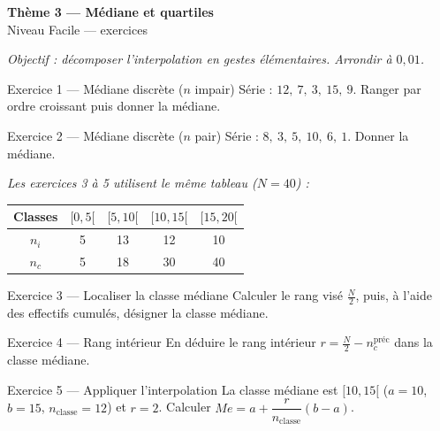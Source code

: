 \documentclass[11pt,a4paper]{article}
\newcommand{\bandeau}[2]{%
\begin{tcolorbox}[boxbase,colback=primary,colframe=primarydark,halign=center,
   before skip=2pt,after skip=12pt]
{\LARGE\bfseries\color{white} #1}\\[3pt]{\normalsize\color{white} #2}
\end{tcolorbox}}
\newcommand{\med}{M\!e}
\begin{document}
\bandeau{Thème 3 — Médiane et quartiles}{Niveau Facile — exercices}

\noindent\textit{Objectif : décomposer l'interpolation en gestes élémentaires. Arrondir à $0{,}01$.}\medskip

\begin{exobox}{Exercice 1 — Médiane discrète ($n$ impair)}
Série : $12,\ 7,\ 3,\ 15,\ 9$. Ranger par ordre croissant puis donner la médiane.
\end{exobox}

\begin{exobox}{Exercice 2 — Médiane discrète ($n$ pair)}
Série : $8,\ 3,\ 5,\ 10,\ 6,\ 1$. Donner la médiane.
\end{exobox}

\noindent\textit{Les exercices 3 à 5 utilisent le même tableau ($N=40$) :}
\begin{center}
\renewcommand{\arraystretch}{1.15}
\begin{tabular}{|c|c|c|c|c|}
\hline
Classes & $[0,5[$ & $[5,10[$ & $[10,15[$ & $[15,20[$ \\\hline
$n_i$ & 5 & 13 & 12 & 10 \\\hline
$n_c$ & 5 & 18 & 30 & 40 \\\hline
\end{tabular}
\end{center}

\begin{exobox}{Exercice 3 — Localiser la classe médiane}
Calculer le rang visé $\tfrac{N}{2}$, puis, à l'aide des effectifs cumulés, désigner la classe
médiane.
\end{exobox}

\begin{exobox}{Exercice 4 — Rang intérieur}
En déduire le rang intérieur $r=\tfrac{N}{2}-n_c^{\text{préc}}$ dans la classe médiane.
\end{exobox}

\begin{exobox}{Exercice 5 — Appliquer l'interpolation}
La classe médiane est $[10,15[$ ($a=10$, $b=15$, $n_{\text{classe}}=12$) et $r=2$.
Calculer $\med=a+\dfrac{r}{n_{\text{classe}}}(b-a)$.
\end{exobox}
\end{document}
